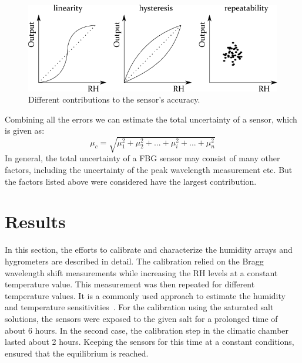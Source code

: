 \begin{figure}[!h]
\centering
\includegraphics[width=0.85\columnwidth]{Chapter5/images/Picture2.png}
\caption{Different contributions to the sensor's accuracy.}
\label{fig:accuracy}
\end{figure}
Combining all the errors we can estimate the total uncertainty of a sensor, which is given as:
\begin{equation}
    \mu_{c} = \sqrt{\mu_{1}^{2} + \mu_{2}^{2} + ... + \mu_{i}^{2} + ... + \mu_{n}^{2}}
\end{equation}
In general, the total uncertainty of a \gls{FBG} sensor may consist of many other factors, including the uncertainty of the peak wavelength measurement etc. But the factors listed above were considered have the largest contribution. 

\section{Results}
\label{fbg_results}
In this section, the efforts to calibrate and characterize the humidity arrays and hygrometers are described in detail. The calibration relied on the Bragg wavelength shift measurements while increasing the \gls{RH} levels at a constant temperature value. This measurement was then repeated for different temperature values. It is a commonly used approach to estimate the humidity and temperature sensitivities~\cite{Berruti}. For the calibration using the saturated salt solutions, the sensors were exposed to the given salt for a prolonged time of about 6 hours. In the second case, the calibration step in the climatic chamber lasted about 2 hours. Keeping the sensors for this time at a constant conditions, ensured that the equilibrium is reached. 
